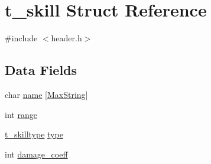 \hypertarget{structt__skill}{\section{t\-\_\-skill Struct Reference}
\label{structt__skill}
}


{\ttfamily \#include $<$header.\-h$>$}

\subsection*{Data Fields}
\begin{DoxyCompactItemize}
\item 
char \hyperlink{structt__skill_ab27f28c5ead39031421706ddbbd1edea}{name} \mbox{[}\hyperlink{header_8h_ab154998a3a376095f3601bc35c5cf523}{Max\-String}\mbox{]}
\item 
int \hyperlink{structt__skill_a037e8e370380046bec287bdc96942091}{range}
\item 
\hyperlink{header_8h_a440f669d36bc2028077af38574051204}{t\-\_\-skilltype} \hyperlink{structt__skill_ac00edc3c188c78c47878a357ecff2954}{type}
\item 
int \hyperlink{structt__skill_a9518a5f7d916a01def3588da5dc0c8fa}{damage\-\_\-coeff}
\end{DoxyCompactItemize}


